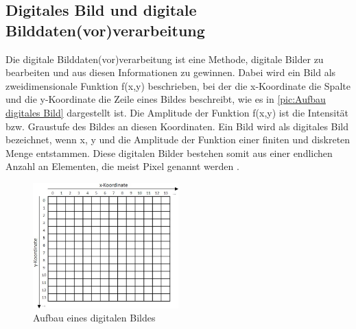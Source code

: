 \documentclass[ngerman,12pt]{article} %
\begin{document}
\subsection{Digitales Bild und digitale Bilddaten(vor)verarbeitung}
\label{sec:Digitales Bild und digitale Bilddaten(vor)verarbeitung}
Die digitale Bilddaten(vor)verarbeitung ist eine Methode, digitale Bilder zu bearbeiten und aus diesen Informationen zu gewinnen. Dabei wird ein Bild als zweidimensionale Funktion f(x,y) beschrieben, bei der die x-Koordinate die Spalte und die y-Koordinate die Zeile eines Bildes beschreibt, wie es in \autoref{pic:Aufbau digitales Bild} dargestellt ist. Die Amplitude der Funktion f(x,y) ist die Intensität bzw. Graustufe des Bildes an diesen Koordinaten. Ein Bild wird als digitales Bild bezeichnet, wenn x, y und die Amplitude der Funktion einer finiten und diskreten Menge entstammen. Diese digitalen Bilder bestehen somit aus einer endlichen Anzahl an Elementen, die meist Pixel genannt werden \cite{Gonzalez}.\\

\begin{figure} [h!tb]
	\begin{center}
	\includegraphics[width=0.5\textwidth]{Aufbau digitales Bild}
	\caption[Aufbau eines digitalen Bildes]{\label{pic:Aufbau digitales Bild}Aufbau eines digitalen Bildes}
	\end{center}
\end{figure}
\end{document}
